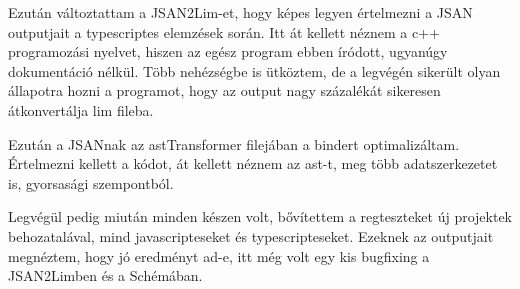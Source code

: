 \noindent

Ezután változtattam a JSAN2Lim-et, hogy képes legyen értelmezni a JSAN outputjait a typescriptes elemzések során.
Itt át kellett néznem a c++ programozási nyelvet, hiszen az egész program ebben íródott, ugyanúgy dokumentáció nélkül.
Több nehézségbe is ütköztem, de a legvégén sikerült olyan állapotra hozni a programot, hogy az output nagy százalékát sikeresen átkonvertálja lim fileba.

\noindent

Ezután a JSANnak az astTransformer filejában a bindert optimalizáltam.
Értelmezni kellett a kódot, át kellett néznem az ast-t, meg több adatszerkezetet is, gyorsasági szempontból.

\noindent

Legvégül pedig miután minden készen volt, bővítettem a regteszteket új projektek behozatalával, mind javascripteseket és typescripteseket.
Ezeknek az outputjait megnéztem, hogy jó eredményt ad-e, itt még volt egy kis bugfixing a JSAN2Limben és a Schémában.
